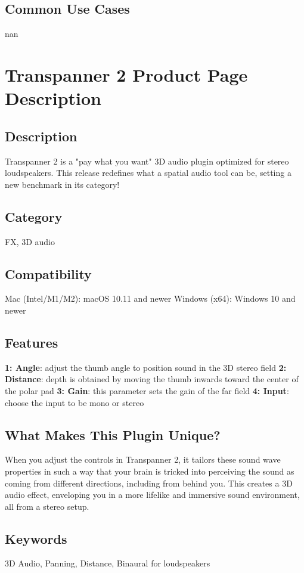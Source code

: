\documentclass[8pt]{article}
\begin{document}
\subsection*{Common Use Cases}
nan
\section*{Transpanner 2 Product Page Description}

\subsection*{Description}
Transpanner 2 is a "pay what you want" 3D audio plugin optimized for stereo loudspeakers. This release redefines what a spatial audio tool can be, setting a new benchmark in its category!

\subsection*{Category}
FX, 3D audio

\subsection*{Compatibility}
Mac (Intel/M1/M2): macOS 10.11 and newer
Windows (x64): Windows 10 and newer

\subsection*{Features}
\textbf{1: Angle}: adjust the thumb angle to position sound in the 3D stereo field
\textbf{2: Distance}: depth is obtained by moving the thumb inwards toward the center of the polar pad
\textbf{3: Gain}: this parameter sets the gain of the far field
\textbf{4: Input}: choose the input to be mono or stereo

\subsection*{What Makes This Plugin Unique?}
When you adjust the controls in Transpanner 2, it tailors these sound wave properties in such a way that your brain is tricked into perceiving the sound as coming from different directions, including from behind you. This creates a 3D audio effect, enveloping you in a more lifelike and immersive sound environment, all from a stereo setup.

\subsection*{Keywords}
3D Audio, Panning, Distance, Binaural for loudspeakers
\end{document}
